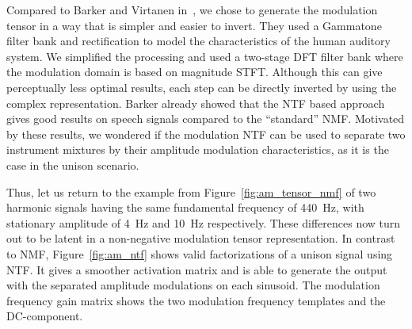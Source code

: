 %
%
\par
Compared to Barker and Virtanen in~\cite{barker13}, we chose to generate the modulation tensor in a way that is simpler and easier to invert. 
They used a Gammatone filter bank and rectification to model the characteristics of the human auditory system. 
We simplified the processing and used a two-stage DFT filter bank where the modulation domain is based on magnitude STFT. 
Although this can give perceptually less optimal results, each step can be directly inverted by using the complex representation.
Barker already showed that the NTF based approach gives good results on speech signals compared to the ``standard'' NMF. 
Motivated by these results, we wondered if the modulation NTF can be used to separate two instrument mixtures by their amplitude modulation characteristics, as it is the case in the unison scenario.
\par
Thus, let us return to the example from Figure~\ref{fig:am_tensor_nmf} of two harmonic signals having the same fundamental frequency of 440~\si{\hertz}, with stationary amplitude of 4~\si{\hertz} and 10~\si{\hertz} respectively. 
These differences now turn out to be latent in a non-negative modulation tensor representation.
In contrast to NMF, Figure~\ref{fig:am_ntf} shows valid factorizations of a unison signal using NTF.
It gives a smoother activation matrix and is able to generate the output with the separated amplitude modulations on each sinusoid. The modulation frequency gain matrix shows the two modulation frequency templates and the DC-component.


